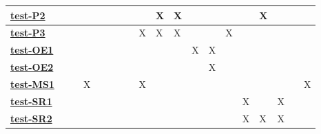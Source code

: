 \documentclass[12pt, titlepage]{article}
\begin{document}
\begin{table}[H]
\begin{adjustwidth}{-1.5in}{-1in}
{\begin{tabular}{l|l|l|l|l|l|l|l|l|l|l|l|l|l|l|l|l|l|l|}
\multicolumn{1}{|l|}{\hyperref[Test-P2]{\textbf{test-P2}}}   &              &              &              &              &              &              &              &              & X            & X            &              &              &              &              & X            &              &              &              \\ \hline
\multicolumn{1}{|l|}{\hyperref[Test-P3]{\textbf{test-P3}}}   &              &              &              &              &              &              &              & X            & X            & X            &              &              & X            &              &              &              &              &              \\ \hline
\multicolumn{1}{|l|}{\hyperref[Test-OE1]{\textbf{test-OE1}}}  &              &              &              &              &              &              &              &              &              &              & X            & X            &              &              &              &              &              &              \\ \hline
\multicolumn{1}{|l|}{\hyperref[Test-OE2]{\textbf{test-OE2}}}  &              &              &              &              &              &              &              &              &              &              &              & X            &              &              &              &              &              &              \\ \hline
\multicolumn{1}{|l|}{\hyperref[Test-MS1]{\textbf{test-MS1}}}  &              &              & X            &              &              &              &              & X            &              &              &              &              &              &              &              &              &              & X            \\ \hline
\multicolumn{1}{|l|}{\hyperref[Test-SR1]{\textbf{test-SR1}}}  &              &              &              &              &              &              &              &              &              &              &              &              &              & X            &              & X            &              &              \\ \hline
\multicolumn{1}{|l|}{\hyperref[Test-SR2]{\textbf{test-SR2}}}  &              &              &              &              &              &              &              &              &              &              &              &              &              & X            & X            & X            &              &              \\ \hline

\end{tabular}}
\end{adjustwidth}
\end{table}
\end{document}
